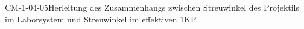 
\begin{PROP}{CM-1-04-05}{Herleitung des Zusammenhangs zwischen Streuwinkel des Projektils im Laborsystem und Streuwinkel im effektiven 1KP}
\end{PROP}

